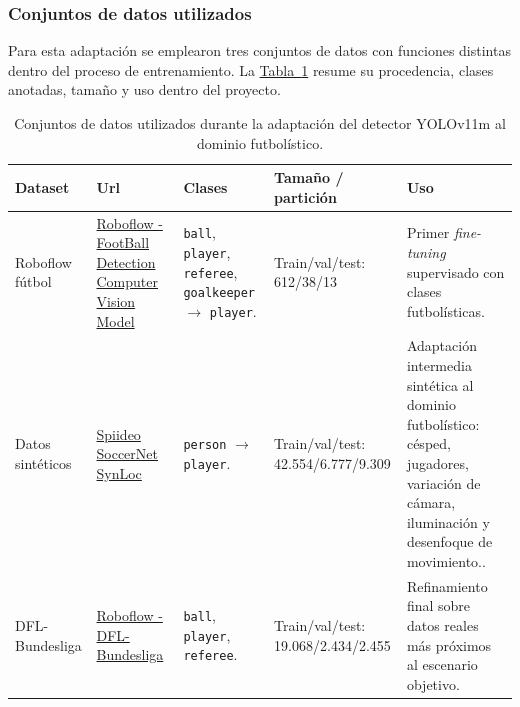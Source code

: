 \subsubsection{Conjuntos de datos utilizados}

Para esta adaptación se emplearon tres conjuntos de datos con funciones distintas dentro del proceso de entrenamiento. La \hyperref[tab:datasets-finetuning-yolo]{Tabla~\ref*{tab:datasets-finetuning-yolo}} resume su procedencia, clases anotadas, tamaño y uso dentro del proyecto.

\begin{table}[H]
\centering
\scriptsize
\renewcommand{\arraystretch}{1.25}
\begin{tabularx}{\textwidth}{
>{\raggedright\arraybackslash}p{2.4cm}
>{\raggedright\arraybackslash}X
>{\raggedright\arraybackslash}p{2.8cm}
>{\raggedright\arraybackslash}p{2.5cm}
>{\raggedright\arraybackslash}X
}
\toprule
\textbf{Dataset} & \textbf{Url} & \textbf{Clases} & \textbf{Tamaño / partición} & \textbf{Uso} \\
\midrule

Roboflow fútbol \label{} &
\href{https://universe.roboflow.com/yolo-atnlh/football-detection-wfhdh}{Roboflow - FootBall Detection Computer Vision Model} &
\texttt{ball}, \texttt{player}, \texttt{referee}, \texttt{goalkeeper} $\rightarrow$ \texttt{player}. &
Train/val/test: 612/38/13 &
Primer \textit{fine-tuning} supervisado con clases futbolísticas. \\

\midrule

Datos sintéticos &
\href{https://research.spiideo.com/login/main.html}{Spiideo SoccerNet SynLoc} &
\texttt{person} $\rightarrow$ \texttt{player}. &
Train/val/test: 42.554/6.777/9.309 &
Adaptación intermedia sintética al dominio futbolístico: césped, jugadores, variación de cámara, iluminación y desenfoque de movimiento.. \\

\midrule

DFL-Bundesliga &
\href{https://universe.roboflow.com/inkyu-sa-e0c78/dfl-bundesliga-soccer-football-gpqdy}{Roboflow - DFL-Bundesliga} &
\texttt{ball}, \texttt{player}, \texttt{referee}. &
Train/val/test: 19.068/2.434/2.455 &
Refinamiento final sobre datos reales más próximos al escenario objetivo. \\

\bottomrule
\end{tabularx}
\caption[Conjuntos de datos utilizados para el fine-tuning del detector]{
Conjuntos de datos utilizados durante la adaptación del detector YOLOv11m al dominio futbolístico.
}
\label{tab:datasets-finetuning-yolo}
\end{table}

